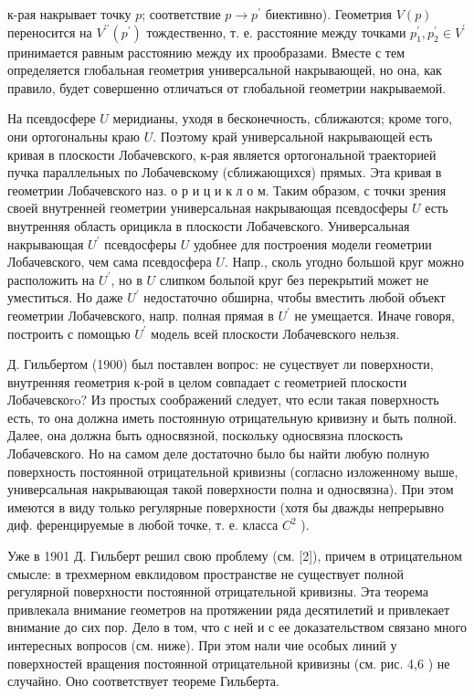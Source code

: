 \documentclass[10pt]{article}
\begin{document}
к-рая накрывает точку $p$; соответствие $p \rightarrow p^{\prime}$ биективно). Геометрия $V(p)$ переносится на $V^{\prime \prime}\left(p^{\prime}\right)$ тождественно, т. е. расстояние между точками $p_{1}^{\prime}, p_{2}^{\prime} \in V^{\prime}$ принимается равным расстоянию между их прообразами. Вместе с тем определяется глобальная геометрия универсальной накрывающей, но она, как правило, будет совершенно отличаться от глобальной геометрии накрываемой.



На псевдосфере $U$ меридианы, уходя в бесконечность, сближаются; кроме того, они ортогональны краю $U$. Поэтому край универсальной накрывающей есть кривая в плоскости Лобачевского, к-рая является ортогональной траекторией пучка параллельных по Лобачевскому (сближающихся) прямых. Эта кривая в геометрии Лобачевского наз. о р и ц и к л о м. Таким образом, с точки зрения своей внутренней геометрии универсальная накрывающая псевдосферы $U$ есть внутренняя область орицикла в плоскости Лобачевского. Универсальная накрывающая $U^{\prime}$ псевдосферы $U$ удобнее для построения модели геометрии Лобачевского, чем сама псевдосфера $U$. Напр., сколь угодно большой круг можно расположить на $U^{\prime}$, но в $U$ слипком больпой круг без перекрытий может не уместиться. Но даже $U^{\prime}$ недостаточно обширна, чтобы вместить любой объект геометрии Лобачевского, напр. полная прямая в $U^{\prime}$ не умещается. Иначе говоря, построить с помощью $U^{\prime}$ модель всей плоскости Лобачевского нельзя.



Д. Гильбертом (1900) был поставлен вопрос: не суцествует ли поверхности, внутренняя геометрия к-рой в целом совпадает с геометрией плоскости Лобачевскоro? Из простых соображений следует, что если такая поверхность есть, то она должна иметь постоянную отрицательную кривизну и быть полной. Далее, она должна быть односвязной, поскольку односвязна плоскость Лобачевского. Но на самом деле достаточно было бы найти любую полную поверхность постоянной отрицательной кривизны (согласно изложенному выше, универсальная накрывающая такой поверхности полна и односвязна). При этом имеются в виду только регулярные поверхности (хотя бы дважды непрерывно диф. ференцируемые в любой точке, т. е. класса $C^{2}$ ).



Уже в 1901 Д. Гильберт решил свою проблему (см. [2]), причем в отрицательном смысле: в трехмерном евклидовом пространстве не существует полной регулярной поверхности постоянной отрицательной кривизны. Эта теорема привлекала внимание геометров на протяжении ряда десятилетий и привлекает внимание до сих пор. Дело в том, что с ней и с ее доказательством связано много интересных вопросов (см. ниже). При этом нали чие особых линий у поверхностей вращения постоянной отрицательной кривизны (см. рис. 4,6 ) не случайно. Оно соответствует теореме Гильберта.
\end{document}
